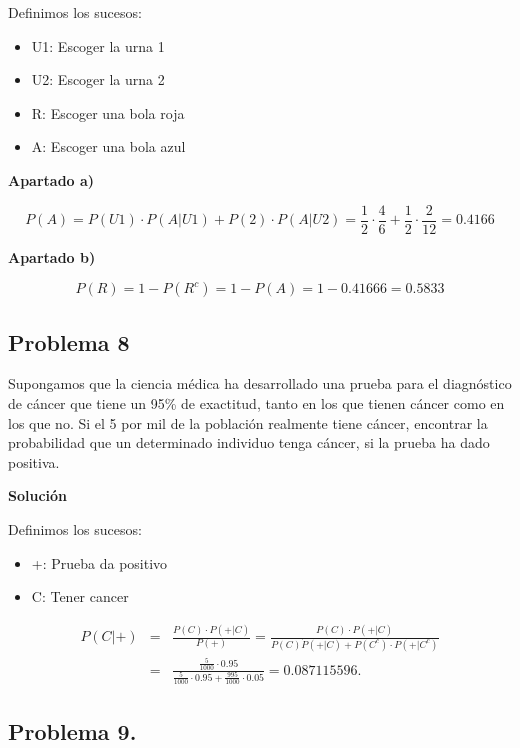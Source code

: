 \documentclass[
]{article}
\providecommand{\tightlist}{%
  \setlength{\itemsep}{0pt}\setlength{\parskip}{0pt}}
\begin{document}
Definimos los sucesos:

\begin{itemize}
\tightlist
\item
  U1: Escoger la urna 1
\item
  U2: Escoger la urna 2
\item
  R: Escoger una bola roja
\item
  A: Escoger una bola azul
\end{itemize}

\textbf{Apartado a)}

\[
P(A) = P(U1) \cdot P(A|U1) + P(2) \cdot P(A|U2) = \frac{1}{2}\cdot \frac{4}{6} + \frac{1}{2} \cdot \frac{2}{12} = 0.4166
\]

\textbf{Apartado b)}

\[
P(R) = 1 - P(R^c) = 1-P(A)= 1 - 0.41666 = 0.5833
\]

\hypertarget{problema-8}{%
\subsection{Problema 8}\label{problema-8}}

Supongamos que la ciencia médica ha desarrollado una prueba para el
diagnóstico de cáncer que tiene un 95\% de exactitud, tanto en los que
tienen cáncer como en los que no. Si el 5 por mil de la población
realmente tiene cáncer, encontrar la probabilidad que un determinado
individuo tenga cáncer, si la prueba ha dado positiva.

\textbf{Solución}

Definimos los sucesos:

\begin{itemize}
\tightlist
\item
  +: Prueba da positivo
\item
  C: Tener cancer
\end{itemize}

\[
\begin{eqnarray*}
P(C|+) &=& \frac{P(C) \cdot P(+|C)}{P(+)} =
\frac{P(C) \cdot P(+|C)}{P(C) \dot P(+|C) + P(C^c) \cdot P(+|C^c)} \\
&=&  \frac{\frac5{1000} \cdot 0.95}{\frac5{1000} \cdot 0.95 + \frac{995}{1000} \cdot 0.05} = 0.087115596.
\end{eqnarray*}
\]

\hypertarget{problema-9.}{%
\subsection{Problema 9.}\label{problema-9.}}
\end{document}

